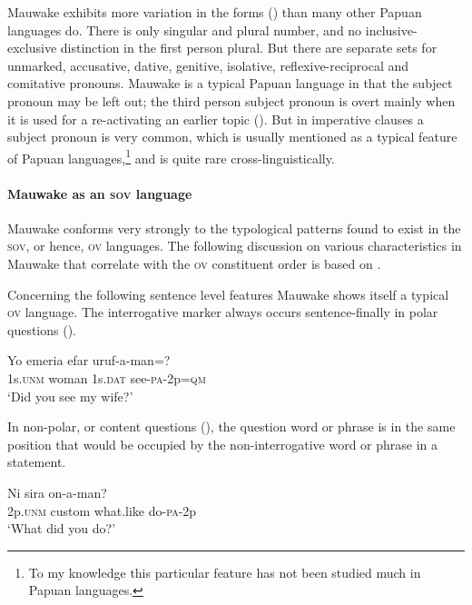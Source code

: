 Mauwake exhibits more variation in the  forms () than many other Papuan languages do.  There is only singular and plural number, and no inclusive-exclusive distinction in the first person plural.  But there are separate sets for unmarked, accusative, dative, genitive, isolative, reflexive-reciprocal and comitative pronouns.  Mauwake is a typical Papuan language in that the subject pronoun may be left out; the third person subject pronoun is overt  mainly when it is used for a re-activating an earlier topic ().  But in imperative clauses a subject pronoun is very common, which is  usually mentioned as a typical feature of Papuan languages,\footnote{To my knowledge this particular feature has not been studied much in Papuan languages.}  and is quite rare cross-linguistically.

\paragraph{Mauwake as an \textsc{sov} language} \label{sec:1.4.2.2}
Mauwake conforms very strongly to the typological patterns found to exist in the \textsc{sov}, or hence, \textsc{ov} languages.  The following discussion on various characteristics in Mauwake that correlate with the \textsc{ov} constituent order is based on \citet{Dryer2007a}.

Concerning the following sentence level features Mauwake shows itself a typical \textsc{ov} language.  The interrogative marker   always occurs sentence-finally in polar questions ().

\ea%
\label{ex:1:x672}
\gll Yo  emeria  efar  uruf-a-man=? \\
1s.\textsc{unm} woman  1s.\textsc{dat}  see-\textsc{pa}-2p=\textsc{qm}     \\
\glt`Did you see my wife?'
\z


In non-polar, or content questions (), the question word or phrase is in the same position that would be occupied by the non-interrogative word or phrase in a statement.

\ea%
\label{ex:1:x673}
\gll Ni  sira   on-a-man? \\
2p.\textsc{unm}  custom  what.like  do-\textsc{pa}-2p      \\
\glt`What did you do?'
\z


